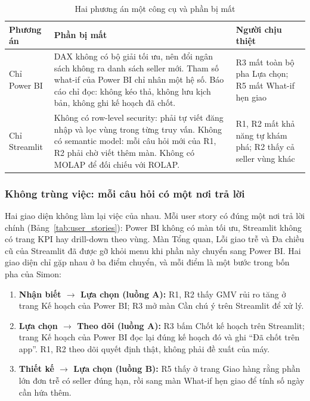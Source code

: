 \begin{table}[htbp]
\centering
\small
\caption{Hai phương án một công cụ và phần bị mất}
\label{tab:one_tool}
\begin{tabularx}{\textwidth}{|>{\raggedright\arraybackslash}m{2.6cm}|L|>{\raggedright\arraybackslash}m{3.6cm}|}
\hline
\textbf{Phương án} & \textbf{Phần bị mất} & \textbf{Người chịu thiệt} \\
\hline
Chỉ Power BI & DAX không có bộ giải tối ưu, nên đổi ngân sách không ra danh sách seller mới. Tham số what-if của Power BI chỉ nhân một hệ số. Báo cáo chỉ đọc: không kéo thả, không lưu kịch bản, không ghi kế hoạch đã chốt. & R3 mất toàn bộ pha Lựa chọn; R5 mất What-if hẹn giao \\
\hline
Chỉ Streamlit & Không có row-level security: phải tự viết đăng nhập và lọc vùng trong từng truy vấn. Không có semantic model: mỗi câu hỏi mới của R1, R2 phải chờ viết thêm màn. Không có MOLAP để đối chiếu với ROLAP. & R1, R2 mất khả năng tự khám phá; R2 thấy cả seller vùng khác \\
\hline
\end{tabularx}
\end{table}

\subsubsection*{Không trùng việc: mỗi câu hỏi có một nơi trả lời}
Hai giao diện không làm lại việc của nhau. Mỗi user story có đúng một nơi trả lời chính (Bảng~\ref{tab:user_stories}): Power BI không có màn tối ưu, Streamlit không có trang KPI hay drill-down theo vùng. Màn Tổng quan, Lỗi giao trễ và Đa chiều cũ của Streamlit đã được gỡ khỏi menu khi phần này chuyển sang Power BI. Hai giao diện chỉ gặp nhau ở ba điểm chuyển, và mỗi điểm là một bước trong bốn pha của Simon:
\begin{enumerate}
    \item \textbf{Nhận biết $\rightarrow$ Lựa chọn (luồng A):} R1, R2 thấy GMV rủi ro tăng ở trang Kế hoạch của Power BI; R3 mở màn Cần chú ý trên Streamlit để xử lý.
    \item \textbf{Lựa chọn $\rightarrow$ Theo dõi (luồng A):} R3 bấm Chốt kế hoạch trên Streamlit; trang Kế hoạch của Power BI đọc lại đúng kế hoạch đó và ghi ``Đã chốt trên app''. R1, R2 theo dõi quyết định thật, không phải đề xuất của máy.
    \item \textbf{Thiết kế $\rightarrow$ Lựa chọn (luồng B):} R5 thấy ở trang Giao hàng rằng phần lớn đơn trễ có seller đúng hạn, rồi sang màn What-if hẹn giao để tính số ngày cần hứa thêm.
\end{enumerate}

